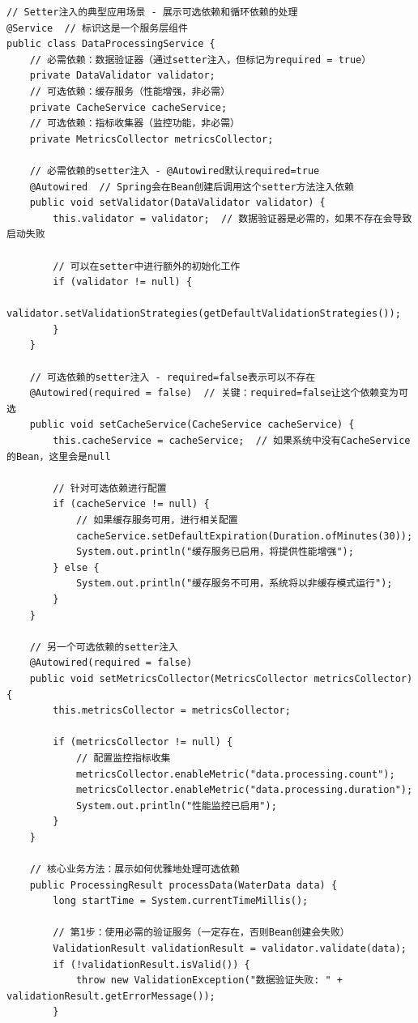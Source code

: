 \begin{lstlisting}[style=java]
// Setter注入的典型应用场景 - 展示可选依赖和循环依赖的处理
@Service  // 标识这是一个服务层组件
public class DataProcessingService {
    // 必需依赖：数据验证器（通过setter注入，但标记为required = true）
    private DataValidator validator;
    // 可选依赖：缓存服务（性能增强，非必需）
    private CacheService cacheService;  
    // 可选依赖：指标收集器（监控功能，非必需）
    private MetricsCollector metricsCollector;  
    
    // 必需依赖的setter注入 - @Autowired默认required=true
    @Autowired  // Spring会在Bean创建后调用这个setter方法注入依赖
    public void setValidator(DataValidator validator) {
        this.validator = validator;  // 数据验证器是必需的，如果不存在会导致启动失败
        
        // 可以在setter中进行额外的初始化工作
        if (validator != null) {
            validator.setValidationStrategies(getDefaultValidationStrategies());
        }
    }
    
    // 可选依赖的setter注入 - required=false表示可以不存在
    @Autowired(required = false)  // 关键：required=false让这个依赖变为可选
    public void setCacheService(CacheService cacheService) {
        this.cacheService = cacheService;  // 如果系统中没有CacheService的Bean，这里会是null
        
        // 针对可选依赖进行配置
        if (cacheService != null) {
            // 如果缓存服务可用，进行相关配置
            cacheService.setDefaultExpiration(Duration.ofMinutes(30));
            System.out.println("缓存服务已启用，将提供性能增强");
        } else {
            System.out.println("缓存服务不可用，系统将以非缓存模式运行");
        }
    }
    
    // 另一个可选依赖的setter注入
    @Autowired(required = false)
    public void setMetricsCollector(MetricsCollector metricsCollector) {
        this.metricsCollector = metricsCollector;
        
        if (metricsCollector != null) {
            // 配置监控指标收集
            metricsCollector.enableMetric("data.processing.count");
            metricsCollector.enableMetric("data.processing.duration");
            System.out.println("性能监控已启用");
        }
    }
    
    // 核心业务方法：展示如何优雅地处理可选依赖
    public ProcessingResult processData(WaterData data) {
        long startTime = System.currentTimeMillis();
        
        // 第1步：使用必需的验证服务（一定存在，否则Bean创建会失败）
        ValidationResult validationResult = validator.validate(data);
        if (!validationResult.isValid()) {
            throw new ValidationException("数据验证失败: " + validationResult.getErrorMessage());
        }
        

\end{lstlisting}
